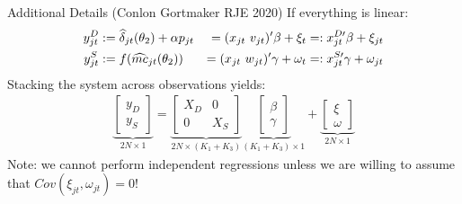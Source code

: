 \documentclass[xcolor=pdftex,dvipsnames,table,mathserif,aspectratio=169]{beamer}
\begin{document}
\begin{frame}{Additional Details (Conlon Gortmaker RJE 2020)}
If everything is linear:
\begin{alignat*}{3}
\label{eq:stacked}
\nonumber y_{jt}^D &:= \widehat \delta_{jt}(\theta_2) + \alpha p_{jt} &=(x_{jt} \-\ v_{jt})' \beta + \xi_t &=: x_{jt}^{D\prime}\beta + \xi_{jt} \\ 
y_{jt}^S &:= f(\widehat{mc}_{jt}(\theta_2)) &= (x_{jt} \-\ w_{jt})'\gamma + \omega_t &=: x_{jt}^{S\prime} \gamma + \omega_{jt} 
\end{alignat*}
Stacking the system across observations yields:
\begin{align*}
\underbrace{\begin{bmatrix} y_D \\ y_S \end{bmatrix}}_{2N\times1} = 
\underbrace{\begin{bmatrix}
X_D & 0 \\
0 & X_S 
\end{bmatrix}}_{2N\times(K_1+K_3)}
\underbrace{\begin{bmatrix}
\beta \\ \gamma %
\end{bmatrix}}_{(K_1+K_3)\times1} + 
\underbrace{\begin{bmatrix}
\xi \\ \omega %
\end{bmatrix}}_{2N\times 1}
\end{align*}
Note: we cannot perform independent regressions unless we are willing to assume that $Cov(\xi_{jt},\omega_{jt})=0$!
\end{frame}
\end{document}
